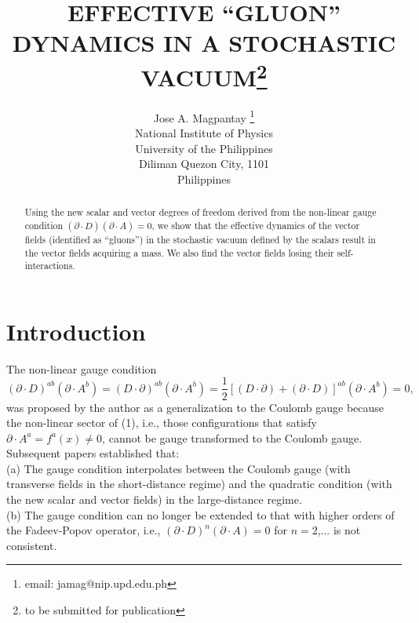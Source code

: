 \documentclass[a4paper,12pt]{article}
\begin{document}
\title{\textbf{EFFECTIVE ``GLUON'' DYNAMICS IN A STOCHASTIC VACUUM}\thanks{to be submitted for publication}}
\author{Jose A. Magpantay \thanks{email: jamag@nip.upd.edu.ph}\\National Institute of Physics\\University of the Philippines\\Diliman Quezon City, 1101\\Philippines}
\maketitle
\begin{abstract}
Using the new scalar and vector degrees of freedom derived from the non-linear gauge condition $(\partial\cdot D)(\partial\cdot A)=0$, we show that the effective dynamics of the vector fields (identified as ``gluons'') in the stochastic vacuum defined by the scalars result in the vector fields acquiring a mass.  We also find the vector fields losing their self-interactions.
\end{abstract}
\clearpage
\section{Introduction}

The non-linear gauge condition	
\begin{equation}\label{1}
(\partial\cdot D)^{ab}(\partial\cdot A^{b})=(D\cdot\partial)^{ab}(\partial\cdot A^{b})=\frac{1}{2}[(D\cdot\partial)+(\partial\cdot D)]^{ab}(\partial\cdot A^{b})=0,
\end{equation}
was proposed by the author\cite{gauge} as a generalization to the Coulomb gauge because the non-linear sector of (1), i.e., those configurations that satisfy $\partial\cdot A^{a}=f^{a}(x)\neq 0$, cannot be gauge transformed to the Coulomb gauge\cite{grav}. Subsequent papers established that:\\

(a) The gauge condition interpolates between the Coulomb gauge (with transverse fields in the short-distance regime) and the quadratic condition (with the new scalar and vector fields) in the large-distance regime\cite{low}.\\

(b) The gauge condition can no longer be extended to that with higher orders of the Fadeev-Popov operator, i.e., $(\partial\cdot D)^{n}(\partial\cdot A)=0$ for $n=2$,... is not consistent\cite{low}.\\  
\end{document}
